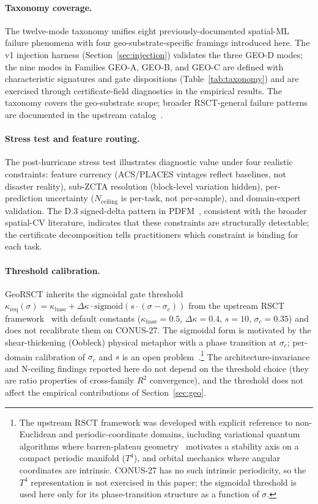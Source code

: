 \documentclass{article}
\begin{document}
\paragraph{Taxonomy coverage.} The twelve-mode taxonomy unifies eight previously-documented spatial-ML failure phenomena with four geo-substrate-specific framings introduced here. The v1 injection harness (Section~\ref{sec:injection}) validates the three GEO-D modes; the nine modes in Families GEO-A, GEO-B, and GEO-C are defined with characteristic signatures and gate dispositions (Table~\ref{tab:taxonomy}) and are exercised through certificate-field diagnostics in the empirical results. The taxonomy covers the geo-substrate scope; broader RSCT-general failure patterns are documented in the upstream catalog~\citep{martin2026rsct}.

\paragraph{Stress test and feature routing.}
The post-hurricane stress test illustrates diagnostic value under four realistic constraints: feature currency (ACS/PLACES vintages reflect baselines, not disaster reality), sub-ZCTA resolution (block-level variation hidden), per-prediction uncertainty ($N_{\text{ceiling}}$ is per-task, not per-sample), and domain-expert validation. The D.3 signed-delta pattern in PDFM~\citep[Table~4]{agarwal2025pdfm}, consistent with the broader spatial-CV literature, indicates that these constraints are structurally detectable; the certificate decomposition tells practitioners which constraint is binding for each task.

\paragraph{Threshold calibration.} GeoRSCT inherits the sigmoidal gate threshold $\kappa_{\text{req}}(\sigma) = \kappa_{\text{base}} + \Delta\kappa \cdot \mathrm{sigmoid}(s \cdot (\sigma - \sigma_c))$ from the upstream RSCT framework~\citep{martin2026rsct} with default constants ($\kappa_{\text{base}}{=}0.5$, $\Delta\kappa{=}0.4$, $s{=}10$, $\sigma_c{=}0.35$) and does not recalibrate them on CONUS-27. The sigmoidal form is motivated by the shear-thickening (Oobleck) physical metaphor with a phase transition at $\sigma_c$; per-domain calibration of $\sigma_c$ and $s$ is an open problem~\citep[\S8.3]{martin2026rsct}.\footnote{The upstream RSCT framework was developed with explicit reference to non-Euclidean and periodic-coordinate domains, including variational quantum algorithms where barren-plateau geometry~\citep{mcclean2018barren,larocca2025barren} motivates a stability axis on a compact periodic manifold ($T^4$), and orbital mechanics where angular coordinates are intrinsic. CONUS-27 has no such intrinsic periodicity, so the $T^4$ representation is not exercised in this paper; the sigmoidal threshold is used here only for its phase-transition structure as a function of $\sigma$.} The architecture-invariance and N-ceiling findings reported here do not depend on the threshold choice (they are ratio properties of cross-family $R^2$ convergence), and the threshold does not affect the empirical contributions of Section~\ref{sec:geo}.
\end{document}

